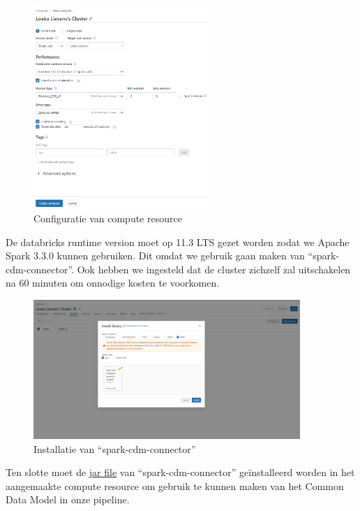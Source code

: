 \begin{figure}[H]
    \centering
    \includegraphics[width=0.6\textwidth]{./graphics/databricks/initial_5.png}
    \caption{Configuratie van compute resource}
\end{figure}

De databricks runtime version moet op 11.3 LTS gezet worden zodat we Apache Spark 3.3.0 kunnen gebruiken. Dit omdat we gebruik gaan maken van ``spark-cdm-connector''. Ook hebben we ingesteld dat de cluster zichzelf zal uitschakelen na 60 minuten om onnodige kosten te voorkomen.

\begin{figure}[H]
    \centering
    \includegraphics[width=0.9\textwidth]{./graphics/databricks/initial_6.png}
    \caption{Installatie van ``spark-cdm-connector''}
\end{figure}

Ten slotte moet de \href{https://github.com/Azure/spark-cdm-connector/releases/tag/spark3.3-1.19.5}{jar file} van ``spark-cdm-connector'' geïnstalleerd worden in het aangemaakte compute resource om gebruik te kunnen maken van het Common Data Model in onze pipeline.

